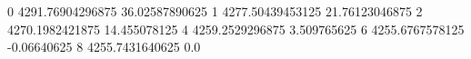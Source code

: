 0 4291.76904296875 36.02587890625
1 4277.50439453125 21.76123046875
2 4270.1982421875 14.455078125
4 4259.2529296875 3.509765625
6 4255.6767578125 -0.06640625
8 4255.7431640625 0.0
